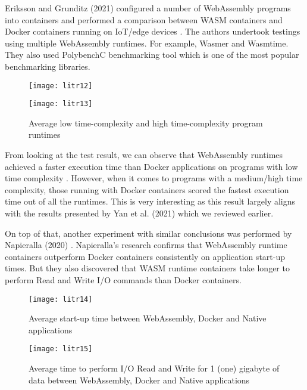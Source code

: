 Eriksson and Grunditz (2021) configured a number of WebAssembly programs into containers and performed a comparison between WASM containers and Docker containers running on IoT/edge devices \cite{lit27}. The authors undertook testings using multiple WebAssembly runtimes. For example, Wasmer and Wasmtime. They also used PolybenchC benchmarking tool which is one of the most popular benchmarking libraries.

\bigskip
\begin{figure}[hp]
\centering
\texttt{[image: litr12]}
\captionsetup{aboveskip=0pt,font=it}
\end{figure}

\begin{figure}[hp]
\centering
\texttt{[image: litr13]}
\caption{\footnotesize{Average low time-complexity and high time-complexity program runtimes \cite{lit27}}}
\captionsetup{aboveskip=0pt,font=it}
\end{figure}
\bigskip

From looking at the test result, we can observe that WebAssembly runtimes achieved a faster execution time than Docker applications on programs with low time complexity \cite{lit28}. However, when it comes to programs with a medium/high time complexity, those running with Docker containers scored the fastest execution time out of all the runtimes. This is very interesting as this result largely aligns with the results presented by Yan et al. (2021) which we reviewed earlier.

On top of that, another experiment with similar conclusions was performed by Napieralla (2020) \cite{lit29}. Napieralla’s research confirms that WebAssembly runtime containers outperform Docker containers consistently on application start-up times. But they also discovered that WASM runtime containers take longer to perform Read and Write I/O commands than Docker containers.

\bigskip
\begin{figure}[hp]
\centering
\texttt{[image: litr14]}
\caption{\footnotesize{Average start-up time between WebAssembly, Docker and Native applications \cite{lit29}}}
\captionsetup{aboveskip=0pt,font=it}
\end{figure}
\bigskip

\newpage
\bigskip
\begin{figure}[hp]
\centering
\texttt{[image: litr15]}
\caption{\footnotesize{Average time to perform I/O Read and Write for 1 (one) gigabyte of data between WebAssembly, Docker and Native applications \cite{lit29}}}
\captionsetup{aboveskip=0pt,font=it}
\end{figure}
\bigskip

